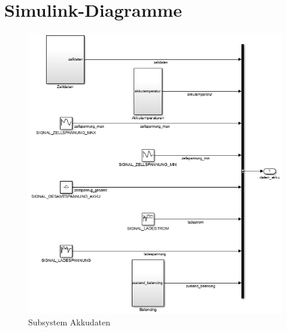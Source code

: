 \documentclass[fontsize = 12pt, paper = a4]{scrreprt}
\begin{document}
\listoffigures

%


\appendix
{} 

\section{Simulink-Diagramme}

\begin{figure}[b]
\centering
\includegraphics[scale = 0.8]{akkudaten}
\caption[Subsystem Akkudaten]{Subsystem Akkudaten}
\end{figure} 

\newpage
\end{document}
